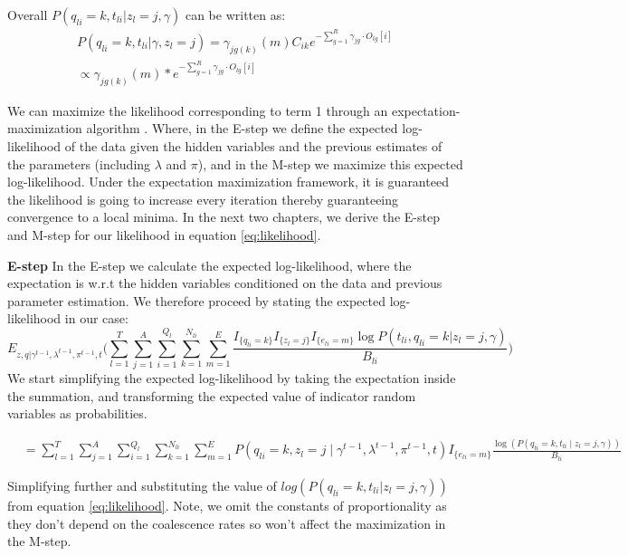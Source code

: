 Overall $P(q_{li} = k, t_{li} | z_l = j, \gamma )$ can be written as: 
\begin{align}
    P(q_{li} = k, t_{li} | \gamma, z_l = j ) = \gamma_{jg(k)}(m)C_{ik}e^{-\sum_{g=1}^R \gamma_{jg}\cdot O_{lg}[i]} \nonumber \\
    \propto \gamma_{jg(k)}(m)*e^{-\sum_{g=1}^R \gamma_{jg}\cdot O_{lg}[i]}
    \label{eq:likelihood}
\end{align}

We can maximize the likelihood corresponding to term 1 through an expectation-maximization algorithm \cite{dempster1977maximum}. Where, in the E-step we define the expected log-likelihood of the data given the hidden variables and the previous estimates of the parameters (including $\lambda$ and $\pi$), and in the M-step we maximize this expected log-likelihood. Under the expectation maximization framework, it is guaranteed the likelihood is going to increase every iteration thereby guaranteeing convergence to a local minima. In the next two chapters, we derive the E-step and M-step for our likelihood in equation \ref{eq:likelihood}.
 
\textbf{E-step}
In the E-step we calculate the expected log-likelihood, where the expectation is w.r.t the hidden variables conditioned on the data and previous parameter estimation. We therefore proceed by stating the expected log-likelihood in our case:
\begin{equation}
   E_{z, q | \gamma^{t-1}, \lambda^{t-1}, \pi^{t-1}, t} \Big(  \sum_{l = 1}^T \sum_{j = 1}^A \sum_{i = 1}^{Q_l} \sum_{k =1}^{N_{li}} \sum_{m = 1}^E  \frac{I_{\{q_{l i} = k\}} I_{\{z_l = j\}} I_{\{e_{l i} = m\}} \log P(t_{li}, q_{l i} = k \vert z_l = j, \gamma)}{B_{li}} \Big)
 \end{equation}
We start simplifying the expected log-likelihood by taking the expectation inside the summation, and transforming the expected value of indicator random variables as probabilities.  

\begin{footnotesize}
\begin{align}
    &= \sum_{l = 1}^T \sum_{j = 1}^A  \sum_{i = 1}^{Q_l} \sum_{k =1}^{N_{li}} \sum_{m = 1}^E P(q_{li} = k, z_l = j \mid \gamma^{t-1}, \lambda^{t-1}, \pi^{t-1}, t) I_{\{e_{l i} = m\}} \frac{\log(P(q_{l i} = k, t_{li} \mid z_l = j, \gamma ))}{B_{li}}
\end{align}
\end{footnotesize}

Simplifying further and substituting the value of $log(P( q_{l i} = k, t_{li} | z_l = j, \gamma ))$ from equation \ref{eq:likelihood}. Note, we omit the constants of proportionality as they don't depend on the coalescence rates so won't affect the maximization in the M-step. 

